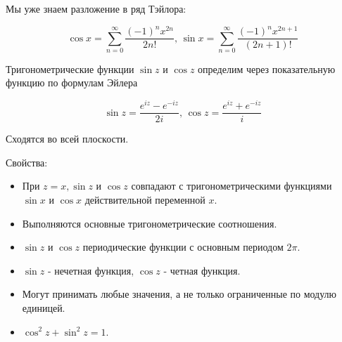 \begin{theorem}  \thmslashn

    Мы уже знаем разложение в ряд Тэйлора:
    
    \[\cos{x}=\sum_{n=0}^{\infty} \frac{(-1)^{n}x^{2n}}{2n!} \text{,  } \sin{x}=\sum_{n=0}^{\infty} \frac{(-1)^{n}x^{2n+1}}{(2n+1)!}\]
    
	Тригонометрические функции $\sin{z}$ и $\cos{z}$ определим через показательную функцию по формулам Эйлера
	
	\[\sin{z}=\frac{e^{iz} - e^{-iz}}{2i} \text{,   } \cos{z}=\frac{e^{iz} + e^{-iz}}{i}\]
    
    Сходятся во всей плоскости.
    
    Свойства:
    
    \begin{itemize}
        \item
        
            При $z = x, \sin{z} \text{ и } \cos{z}$ совпадают с тригонометрическими функциями $\sin{x} \text{ и } \cos{x}$ действительной переменной $x$.
            
        \item
        
            Выполняются основные тригонометрические соотношения.
            
        \item
            
            $\sin{z} \text{ и } \cos{z}$ периодические функции с основным периодом $2\pi$.
            
        \item
            
            $\sin{z}$ - нечетная функция, $\cos{z}$ - четная функция.
                
        \item
                
            Могут принимать любые значения, а не только ограниченные по модулю единицей.
                
        \item
        
            $\cos^{2}z + \sin^{2}z = 1$.
            
    \end{itemize}
    
\end{theorem}


